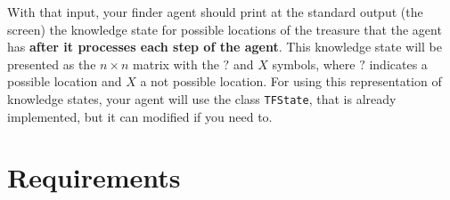 \documentclass{tufte-handout}
\begin{document}
\begin{fullwidth}


With that input, your finder agent should print at the standard output
 (the screen)
the knowledge state for possible locations of the treasure that the agent
has {\bf after it processes each step of the agent}.
This knowledge state will be presented as the $n \times n$
matrix with the $?$ and $X$ symbols, where $?$ indicates a possible location
and $X$ a not possible location. For using this representation of knowledge states, your
agent will use the class {\tt TFState}, that is already implemented, but it can
modified if you need to.
\end{fullwidth}


\section{Requirements}
\end{document}
